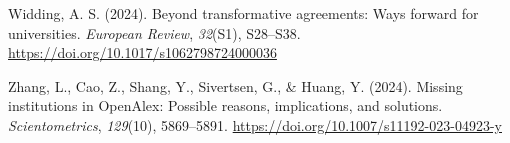 \documentclass[a4paper,man,floatsintext,longtable,noextraspace,10pt]{apa6}
\newlength{\cslhangindent}
\newenvironment{CSLReferences}[2] %
{\begin{list}{}{%
  \setlength{\itemindent}{0pt}
  \setlength{\leftmargin}{0pt}
  \setlength{\parsep}{0pt}
  \ifodd #1
  \setlength{\leftmargin}{\cslhangindent}
  \setlength{\itemindent}{-1\cslhangindent}
  \fi
  \setlength{\itemsep}{#2\baselineskip}}}
{\end{list}}
\begin{document}
\begin{CSLReferences}{1}{0}
Widding, A. S. (2024). Beyond transformative agreements: Ways forward
for universities. \emph{European Review}, \emph{32}(S1), S28--S38.
\url{https://doi.org/10.1017/s1062798724000036}

Zhang, L., Cao, Z., Shang, Y., Sivertsen, G., \& Huang, Y. (2024).
Missing institutions in OpenAlex: Possible reasons, implications, and
solutions. \emph{Scientometrics}, \emph{129}(10), 5869--5891.
\url{https://doi.org/10.1007/s11192-023-04923-y}

\end{CSLReferences}
\end{document}
